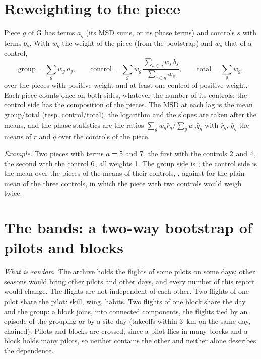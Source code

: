 \section{Reweighting to the piece}\label{app:reweight}

Piece $g$ of $\mathrm{G}$ has terms $a_g$ (its MSD sums, or its phase terms) and controls $s$ with terms $b_s$. With $w_g$ the weight of the piece (from the bootstrap) and $w_s$ that of a control,
\[
  \text{group}=\sum_g w_g\,a_g,\qquad
  \text{control}=\sum_g w_g\,\frac{\sum_{s\in g}w_s\,b_s}{\sum_{s\in g}w_s},\qquad
  \text{total}=\sum_g w_g,
\]
over the pieces with positive weight and at least one control of positive weight. Each piece counts once on both sides, whatever the number of its controls: the control side has the composition of the pieces. The MSD at each lag is the mean $\text{group}/\text{total}$ (resp. control/total), the logarithm and the slopes are taken after the means,
and the phase statistics are the ratios $\sum_g w_g\bar r_g/\sum_g w_g\bar q_g$ with $\bar r_g$, $\bar q_g$ the means of $r$ and $q$ over the controls of the piece.

\emph{Example.} Two pieces with terms $a=5$ and $7$, the first with the controls $2$ and $4$, the second with the control $6$, all weights 1. The group side is \ToyRwGroup; the control side is the mean over the pieces of the means of their controls, \ToyRwControl,
against \ToyRwPooled{} for the plain mean of the three controls, in which the piece with two controls would weigh twice.

\section{The bands: a two-way bootstrap of pilots and blocks}\label{app:bootstrap}

\emph{What is random.} The archive holds the flights of some pilots on some days; other seasons would bring other pilots and other days, and every number of this report would change. The flights are not independent of each other.
Two flights of one pilot share the pilot: skill, wing, habits. Two flights of one block share the day and the group: a block joins, into connected components, the flights tied by an episode of the grouping or by a site-day (takeoffs within 3~km on the same day, chained).
Pilots and blocks are crossed, since a pilot flies in many blocks and a block holds many pilots, so neither contains the other and neither alone describes the dependence.

